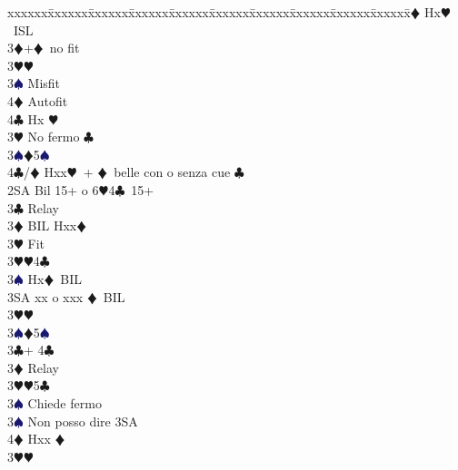 \documentclass[a4paper,italian]{article}
\newcommand{\BC}{\textcolor{OliveGreen}{$\clubsuit$}}
\newcommand{\BD}{\textcolor{RedOrange}{$\vardiamondsuit$}}
\newcommand{\BH}{\textcolor{Red2}{$\varheartsuit${}}}
\newcommand{\BS}{\textcolor{MidnightBlue}{$\spadesuit${}}}
\newenvironment{bidtable}
{\begin{tabbing}

    xxxxxx\=xxxxxx\=xxxxxx\=xxxxxx\=xxxxxx\=xxxxxx\=xxxxxx\=xxxxxx\=xxxxxx\=xxxxxx\=\kill}
{\end{tabbing} }%
\begin{document}
\begin{multicols}{2}
\begin{bidtable}
                                            4\BD \> Hx\BH\ ISL\-\-\\
                                            3\BD {}+\BD\ no fit\+\\
                                            3\BH {}\BH \+\\
                                            3\BS \> Misfit\\
                                            4\BD \> Autofit\\
                                            4\BC \> Hx \BH \-\-\\
                                            3\BH \> No fermo \BC \\
                                            3\BS {}\BD 5\BS \\
                                            4\BC/\BD \> Hxx\BH\ + \BD\ belle con o senza cue \BC\-\\
                                            2SA \> Bil 15+ o 6\BH 4\BC\ 15+\+\\
                                            3\BC \> Relay\+\\
                                            3\BD \> BIL Hxx\BD \+\\
                                            3\BH \> Fit\-\\
                                            3\BH {}\BH 4\BC \\
                                            3\BS \> Hx\BD\ BIL\\
                                            3SA \> xx o xxx \BD\ BIL\-\\
                                            3\BH {}\BH \\
                                            3\BS {}\BD 5\BS \-\\
                                            3\BC {}+ 4\BC \+\\
                                            3\BD \> Relay\+\\
                                            3\BH {}\BH 5\BC \+\\
                                            3\BS \> Chiede fermo\-\\
                                            3\BS \> Non posso dire 3SA\\
                                            4\BD \> Hxx \BD \-\\
                                            3\BH {}\BH \\

\end{bidtable}
\end{multicols}
\end{document}
